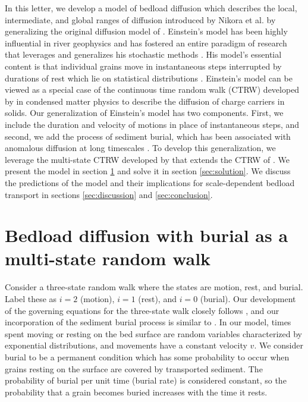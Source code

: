 \documentclass[]{agujournal2018}
\begin{document}
In this letter, we develop a model of bedload diffusion which describes the local, intermediate, and global ranges of diffusion introduced by Nikora et al. by generalizing the original diffusion model of \citet{Einstein1937}.
Einstein's model has been highly influential in river geophysics and has fostered an entire paradigm of research that leverages and generalizes his stochastic methods \citep[e.g.][]{Hubbell1964, Yano1969, Yang1971, Gordon1972, Nakagawa1976}.
His model's essential content is that individual grains move in instantaneous steps interrupted by durations of rest which lie on statistical distributions \citep{Hassan1991}.
Einstein's model can be viewed as a special case of the continuous time random walk (CTRW) developed by \citet{Montroll1965} in condensed matter physics to describe the diffusion of charge carriers in solids.
Our generalization of Einstein's model has two components. First, we include the duration and velocity of motions in place of instantaneous steps, and second, we add the process of sediment burial, which has been associated with anomalous diffusion at long timescales \citep[e.g.][]{Bradley2017,Martin2014}.
To develop this generalization, we leverage the multi-state CTRW developed by \citet{Weiss1976, Weiss1994} that extends the CTRW of \citet{Montroll1965}.
We present the model in section \ref{sec:model} and solve it in section \ref{sec:solution}. We discuss the predictions of the model and their implications for scale-dependent bedload transport in sections \ref{sec:discussion} and \ref{sec:conclusion}.

\section{Bedload diffusion with burial as a multi-state random walk}
\label{sec:model}
Consider a three-state random walk where the states are motion, rest, and burial.
Label these as $i=2$ (motion), $i=1$ (rest), and $i=0$ (burial).
Our development of the governing equations for the three-state walk closely follows \citet{Weiss1994}, and our incorporation of the sediment burial process is similar to \citet{Schmidt2007}.
In our model, times spent moving or resting on the bed surface are random variables characterized by exponential distributions, and movements have a constant velocity $v$.
We consider burial to be a permanent condition which has some probability to occur when grains resting on the surface are covered by transported sediment.
The probability of burial per unit time (burial rate) is considered constant, so the probability that a grain becomes buried increases with the time it rests.
\end{document}
